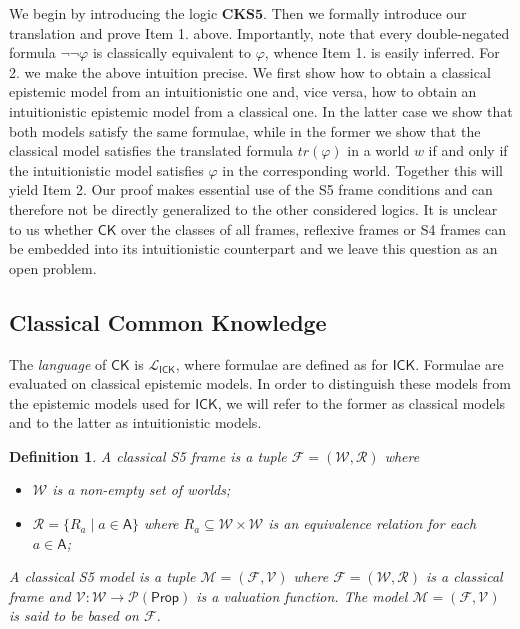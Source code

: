 \documentclass{myifcolog}
\newcommand\Prop {\mathsf{Prop}}
\newcommand\A{\mathsf{A}}
\newcommand{\agi}{a}
\newcommand{\ICK}{\mathsf{ICK}}
\newcommand{\fw}{\mathcal{M}}
\newcommand{\W}{\mathcal{W}}
\newcommand{\rel}{\mathcal{R}}
\newcommand{\V}{\mathcal{V}}
\newtheorem{definition}[theorem]{Definition}
\numberwithin{theorem}{section}
\begin{document}
    We begin by introducing the logic $\mathbf{CKS5}$. Then we formally introduce our translation and prove Item 1. above. Importantly, note that every double-negated formula $\neg\neg \varphi$ is classically equivalent to $\varphi$, whence Item 1. is easily inferred. For 2. we make the above intuition precise. We first show how to obtain a classical epistemic model from an intuitionistic one and, vice versa, how to obtain an intuitionistic epistemic model from a classical one. In the latter case we show that both models satisfy the same formulae, while in the former we show that the classical model satisfies the translated formula $tr(\varphi)$ in a world $w$ if and only if the intuitionistic model satisfies $\varphi$ in the corresponding world. Together this will yield Item 2. Our proof makes essential use of the S5 frame conditions and can therefore not be directly generalized to the other considered logics. It is unclear to us whether $\mathsf{CK}$ over the classes of all frames, reflexive frames or S4 frames can be embedded into its intuitionistic counterpart and we leave this question as an open problem. 
    
\subsection{Classical Common Knowledge}

The \emph{language} of $\mathsf{CK}$ is $\mathcal{L}_{\ICK}$, where formulae are defined as for $\mathsf{ICK}$. Formulae are evaluated on classical epistemic models. In order to distinguish these models from the epistemic models used for $\mathsf{ICK}$, we will refer to the former as classical models and to the latter as intuitionistic models.
    
\begin{definition}
A \emph{classical S5 frame} is a tuple $\mathcal{F} = (\W, \rel)$ where
        \begin{itemize}
            \item $\W$ is a non-empty set of \emph{worlds};
            \item $\rel = \{ R_\agi \mid \agi \in \A\}$ where $R_\agi \subseteq \W \times \W$ is an equivalence relation for each $\agi \in \A$;
        \end{itemize}
A \emph{classical S5 model} is a tuple $\fw =(\mathcal{F}, \V)$ where $\mathcal{F}=(\W, \rel)$ is a classical frame and $\V: \W \longrightarrow \mathcal{P}(\Prop)$ is a valuation function. The model  $\fw =(\mathcal{F}, \V)$ is said to be \emph{based} on $\mathcal{F}$.
\end{definition}
\end{document}
